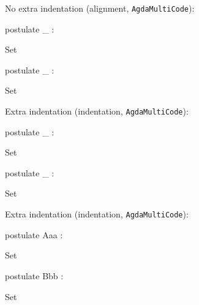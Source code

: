 \documentclass{article}
\begin{document}
\noindent No extra indentation (alignment, \texttt{AgdaMultiCode}):
\begin{AgdaMultiCode}
\begin{code}[hide]
  postulate
    _ :
\end{code}
\begin{code}
      Set
\end{code}
\begin{code}[hide]
  postulate
    _ :
\end{code}
\begin{code}
      Set
\end{code}
\end{AgdaMultiCode}

\noindent Extra indentation (indentation, \texttt{AgdaMultiCode}):
\begin{AgdaMultiCode}
\begin{code}[hide]
  postulate
    _ :
\end{code}
\begin{code}
       Set
\end{code}
\begin{code}[hide]
  postulate
    _ :
\end{code}
\begin{code}
       Set
\end{code}
\end{AgdaMultiCode}

\noindent Extra indentation (indentation, \texttt{AgdaMultiCode}):
\begin{AgdaMultiCode}
\begin{code}[hide]
  postulate
    Aaa :
\end{code}
\begin{code}
      Set
\end{code}
\begin{code}[hide]
  postulate
    Bbb :
\end{code}
\begin{code}
      Set
\end{code}
\end{AgdaMultiCode}
\end{document}
